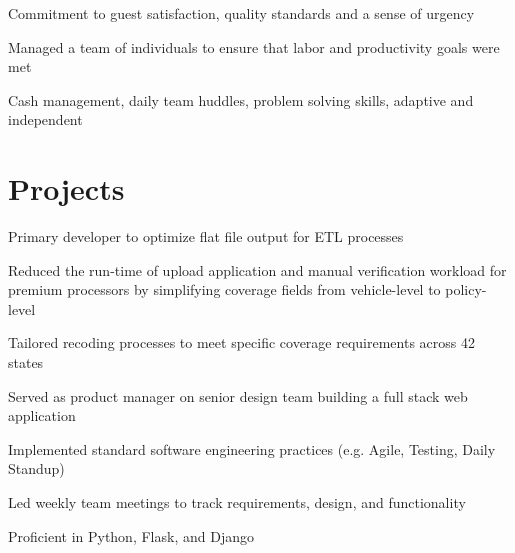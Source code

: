\documentclass[]{latex/resume}
\begin{document}
\begin{minipage}[t]{0.75\textwidth}
    \sectionsep

     
    \vspace{\topsep} %
    \begin{tightemize}
            \item Commitment to guest satisfaction, quality standards and a sense of urgency
            \item Managed a team of individuals to ensure that labor and productivity goals were met
            \item Cash management, daily team huddles, problem solving skills, adaptive and independent
    \end{tightemize}
    



\section{Projects}

     
    \begin{tightemize}
        \item Primary developer to optimize flat file output for ETL processes
        \item Reduced the run-time of upload application and manual verification workload for premium processors by simplifying coverage fields from vehicle-level to policy-level
        \item Tailored recoding processes to meet specific coverage requirements across 42 states
    \end{tightemize}

    \sectionsep

     
    \begin{tightemize}
        \item Served as product manager on senior design team building a full stack web application 
        \item Implemented standard software engineering practices (e.g. Agile, Testing, Daily Standup)
        \item Led weekly team meetings to track requirements, design, and functionality
        \item Proficient in Python, Flask, and Django
    \end{tightemize}


\end{minipage}
\end{document}

